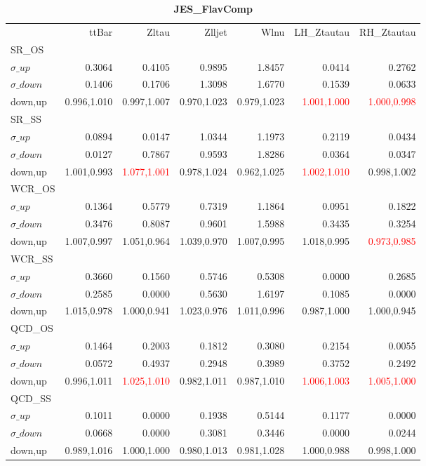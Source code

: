 \documentclass[11pt,oneside,a4paper]{article}
\begin{document}
\begin{table}
\centering
\caption{\bf{JES\_FlavComp}}
\begin{tabular}{lrrrrrr}
 & ttBar & Zltau & Zlljet & Wlnu & LH\_Ztautau & RH\_Ztautau \\
SR\_OS &  &  &  &  &  &  \\
$\sigma\_up$ & 0.3064 & 0.4105 & 0.9895 & 1.8457 & 0.0414 & 0.2762 \\
$\sigma\_down$ & 0.1406 & 0.1706 & 1.3098 & 1.6770 & 0.1539 & 0.0633 \\
down,up & 0.996,1.010 & 0.997,1.007 & 0.970,1.023 & 0.979,1.023 & \textcolor{red}{1.001,1.000} & \textcolor{red}{1.000,0.998} \\

\hline
SR\_SS &  &  &  &  &  &  \\
$\sigma\_up$ & 0.0894 & 0.0147 & 1.0344 & 1.1973 & 0.2119 & 0.0434 \\
$\sigma\_down$ & 0.0127 & 0.7867 & 0.9593 & 1.8286 & 0.0364 & 0.0347 \\
down,up & 1.001,0.993 & \textcolor{red}{1.077,1.001} & 0.978,1.024 & 0.962,1.025 & \textcolor{red}{1.002,1.010} & 0.998,1.002 \\

\hline
WCR\_OS &  &  &  &  &  &  \\
$\sigma\_up$ & 0.1364 & 0.5779 & 0.7319 & 1.1864 & 0.0951 & 0.1822 \\
$\sigma\_down$ & 0.3476 & 0.8087 & 0.9601 & 1.5988 & 0.3435 & 0.3254 \\
down,up & 1.007,0.997 & 1.051,0.964 & 1.039,0.970 & 1.007,0.995 & 1.018,0.995 & \textcolor{red}{0.973,0.985} \\

\hline
WCR\_SS &  &  &  &  &  &  \\
$\sigma\_up$ & 0.3660 & 0.1560 & 0.5746 & 0.5308 & 0.0000 & 0.2685 \\
$\sigma\_down$ & 0.2585 & 0.0000 & 0.5630 & 1.6197 & 0.1085 & 0.0000 \\
down,up & 1.015,0.978 & 1.000,0.941 & 1.023,0.976 & 1.011,0.996 & 0.987,1.000 & 1.000,0.945 \\

\hline
QCD\_OS &  &  &  &  &  &  \\
$\sigma\_up$ & 0.1464 & 0.2003 & 0.1812 & 0.3080 & 0.2154 & 0.0055 \\
$\sigma\_down$ & 0.0572 & 0.4937 & 0.2948 & 0.3989 & 0.3752 & 0.2492 \\
down,up & 0.996,1.011 & \textcolor{red}{1.025,1.010} & 0.982,1.011 & 0.987,1.010 & \textcolor{red}{1.006,1.003} & \textcolor{red}{1.005,1.000} \\

\hline
QCD\_SS &  &  &  &  &  &  \\
$\sigma\_up$ & 0.1011 & 0.0000 & 0.1938 & 0.5144 & 0.1177 & 0.0000 \\
$\sigma\_down$ & 0.0668 & 0.0000 & 0.3081 & 0.3446 & 0.0000 & 0.0244 \\
down,up & 0.989,1.016 & 1.000,1.000 & 0.980,1.013 & 0.981,1.028 & 1.000,0.988 & 0.998,1.000 \\

\hline
\end{tabular}
\end{table}
\end{document}
